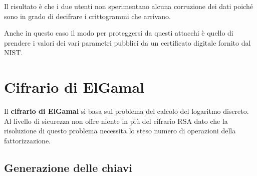 Il risultato \`e che i due utenti non sperimentano alcuna corruzione dei dati poich\'e sono in grado di decifrare
i crittogrammi che arrivano.

Anche in questo caso il modo per proteggersi da questi attacchi \`e quello di prendere i valori dei vari parametri
pubblici da un certificato digitale fornito dal NIST.

\section{Cifrario di ElGamal}
Il \textbf{cifrario di ElGamal} si basa sul problema del calcolo del logaritmo discreto. Al livello di sicurezza
non offre niente in pi\`u del cifrario RSA dato che la risoluzione di questo problema necessita lo steso numero
di operazioni della fattorizzazione.

\subsection{Generazione delle chiavi}
